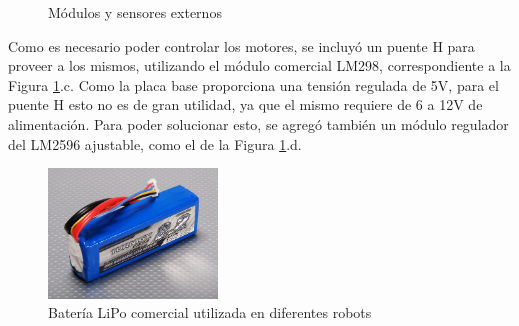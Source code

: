 \begin{figure}
    \centering
    \qquad
    \qquad
    \qquad
    \caption{Módulos y sensores externos}
    \label{fig:externalmodulesandsensors}
\end{figure}

Como es necesario poder controlar los motores, se incluyó un puente H para proveer a los mismos, utilizando el módulo comercial LM298, correspondiente a la Figura \ref{fig:externalmodulesandsensors}.c. Como la placa base proporciona una tensión regulada de 5V, para el puente H esto no es de gran utilidad, ya que el mismo requiere de 6 a 12V de alimentación. Para poder solucionar esto, se agregó también un módulo regulador del LM2596 ajustable, como el de la Figura \ref{fig:externalmodulesandsensors}.d.

\begin{figure}
    \centering
    \includegraphics[width=0.4\textwidth]{Img/LiPo3S.jpg}
    \caption{Batería LiPo comercial utilizada en diferentes robots}
    \label{fig:lipobattery}
\end{figure}
